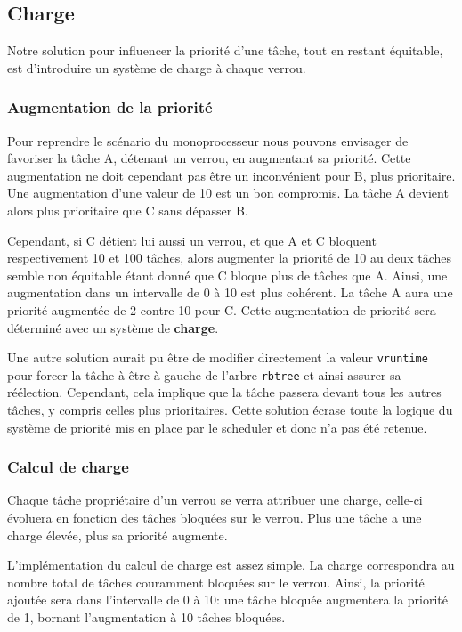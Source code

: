 \subsection{Charge}

Notre solution pour influencer la priorité d'une tâche, tout en restant équitable,
est d'introduire un système de charge à chaque verrou.

\subsubsection{Augmentation de la priorité}

Pour reprendre le scénario du monoprocesseur nous pouvons envisager de favoriser la tâche A, détenant un verrou,
en augmentant sa priorité. Cette augmentation ne doit cependant pas être un inconvénient pour B,
plus prioritaire. Une augmentation d'une valeur de 10 est un bon compromis. La tâche A
devient alors plus prioritaire que C sans dépasser B.

Cependant, si C détient lui aussi un verrou, et que A et C bloquent respectivement 
10 et 100 tâches, alors augmenter la priorité de 10 au deux tâches semble non équitable
étant donné que C bloque plus de tâches que A. Ainsi, une augmentation dans un
intervalle de 0 à 10 est plus cohérent. La tâche A aura une priorité augmentée
de 2 contre 10 pour C. Cette augmentation de priorité sera déterminé
avec un système de \textbf{charge}.

Une autre solution aurait pu être de modifier directement la valeur \verb|vruntime|
pour forcer la tâche à être à gauche de l'arbre \verb|rbtree| et ainsi assurer sa
réélection. Cependant, cela implique que la tâche passera devant tous les autres tâches,
y compris celles plus prioritaires. Cette solution écrase toute la logique du système
de priorité mis en place par le scheduler et donc n'a pas été retenue.


\subsubsection{Calcul de charge}

Chaque tâche propriétaire d'un verrou se verra attribuer une charge, celle-ci évoluera en fonction
des tâches bloquées sur le verrou. Plus une tâche a une charge élevée, plus sa priorité augmente.

L'implémentation du calcul de charge est assez simple. 
La charge correspondra au nombre total de tâches couramment bloquées sur le verrou. 
Ainsi, la priorité ajoutée sera dans l'intervalle de 0 à 10: une tâche bloquée augmentera
la priorité de 1, bornant l'augmentation à 10 tâches bloquées.


